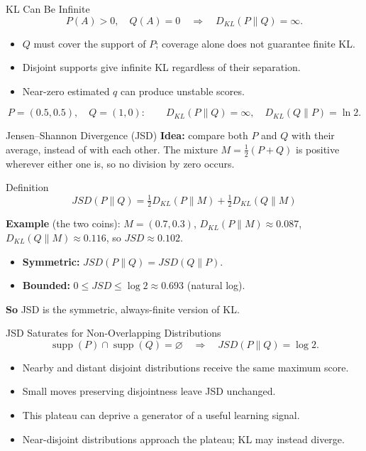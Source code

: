 \documentclass[10pt,aspectratio=169]{ntuabeamer}
\newcommand{\takeaway}[1]{\par\vspace{0.7em}\textcolor{ntuablue}{\textbf{So} #1}\par}
\begin{document}
	\begin{frame}{KL Can Be Infinite}
\small
\[
 P(A)>0,\quad Q(A)=0\quad\Longrightarrow\quad D_{KL}(P\|Q)=\infty.
\]
\begin{itemize}
\item $Q$ must cover the support of $P$; coverage alone does not guarantee finite KL.
\item Disjoint supports give infinite KL regardless of their separation.
\item Near-zero estimated $q$ can produce unstable scores.
\end{itemize}
\[
 P=(0.5,0.5),\quad Q=(1,0):\qquad
 D_{KL}(P\|Q)=\infty,\quad D_{KL}(Q\|P)=\ln2.
\]
\end{frame}

	\begin{frame}{Jensen--Shannon Divergence (JSD)}
		\small
		\textbf{Idea:} compare both $P$ and $Q$ with their average, instead of with each other.
		The mixture $M=\tfrac12(P+Q)$ is positive wherever either one is, so no division by zero occurs.
		\begin{block}{Definition}
			$$ JSD(P \| Q) = \tfrac{1}{2} D_{KL}(P \| M) + \tfrac{1}{2} D_{KL}(Q \| M) $$
		\end{block}
		\textbf{Example} (the two coins): $M=(0.7,0.3)$, $D_{KL}(P\|M)\approx 0.087$, $D_{KL}(Q\|M)\approx 0.116$, so $JSD\approx 0.102$.

		\begin{itemize}
			\item \textbf{Symmetric:} $JSD(P\|Q)=JSD(Q\|P)$.
			\item \textbf{Bounded:} $0\le JSD\le\log 2\approx 0.693$ (natural log).
		\end{itemize}
		\takeaway{JSD is the symmetric, always-finite version of KL.}
	\end{frame}

	\begin{frame}{JSD Saturates for Non-Overlapping Distributions}
\small
\[
 \operatorname{supp}(P)\cap\operatorname{supp}(Q)=\varnothing
 \quad\Longrightarrow\quad JSD(P\|Q)=\log2.
\]
\begin{itemize}
\item Nearby and distant disjoint distributions receive the same maximum score.
\item Small moves preserving disjointness leave JSD unchanged.
\item This plateau can deprive a generator of a useful learning signal.
\item Near-disjoint distributions approach the plateau; KL may instead diverge.
\end{itemize}
\end{frame}
\end{document}
